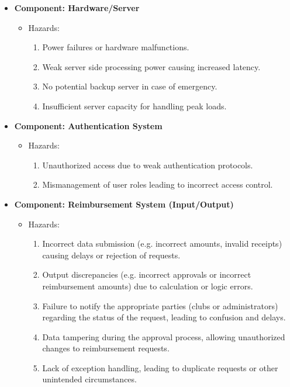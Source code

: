 \documentclass{article}
\begin{document}
\begin{itemize}
    \item \textbf{Component: Hardware/Server} 
    \begin{itemize}
        \item Hazards:
        \begin{enumerate}
            \item Power failures or hardware malfunctions.
            \item Weak server side processing power causing increased latency. 
            \item No potential backup server in case of emergency.
            \item Insufficient server capacity for handling peak loads.
        \end{enumerate}
    \end{itemize}

    \item \textbf{Component: Authentication System} 
    \begin{itemize}
        \item Hazards:
        \begin{enumerate}
            \item Unauthorized access due to weak authentication protocols.
            \item Mismanagement of user roles leading to incorrect access control.
        \end{enumerate}
    \end{itemize}

    \item \textbf{Component: Reimbursement System (Input/Output)} 
    \begin{itemize}
        \item Hazards:
        \begin{enumerate}
            \item Incorrect data submission (e.g. incorrect amounts, invalid receipts) causing delays or rejection of requests.
            \item Output discrepancies (e.g. incorrect approvals or incorrect reimbursement amounts) due to calculation or logic errors.
            \item Failure to notify the appropriate parties (clubs or administrators) regarding the status of the request, leading to confusion and delays.
            \item Data tampering during the approval process, allowing unauthorized changes to reimbursement requests.
            \item Lack of exception handling, leading to duplicate requests or other unintended circumstances. 
        \end{enumerate}
    \end{itemize}
    
\end{itemize}
\end{document}
